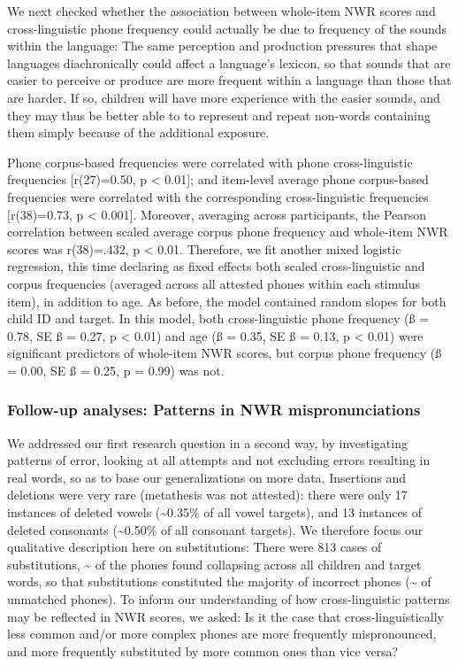 \documentclass[
  english,
  ,man,floatsintext]{apa6}
\begin{document}
We next checked whether the association between whole-item NWR scores and cross-linguistic phone frequency could actually be due to frequency of the sounds within the language: The same perception and production pressures that shape languages diachronically could affect a language's lexicon, so that sounds that are easier to perceive or produce are more frequent within a language than those that are harder. If so, children will have more experience with the easier sounds, and they may thus be better able to to represent and repeat non-words containing them simply because of the additional exposure.

Phone corpus-based frequencies were correlated with phone cross-linguistic frequencies {[}r(27)=0.50, p \textless{} 0.01{]}; and item-level average phone corpus-based frequencies were correlated with the corresponding cross-linguistic frequencies {[}r(38)=0.73, p \textless{} 0.001{]}. Moreover, averaging across participants, the Pearson correlation between scaled average corpus phone frequency and whole-item NWR scores was r(38)=.432, p \textless{} 0.01. Therefore, we fit another mixed logistic regression, this time declaring as fixed effects both scaled cross-linguistic and corpus frequencies (averaged across all attested phones within each stimulus item), in addition to age. As before, the model contained random slopes for both child ID and target. In this model, both cross-linguistic phone frequency (ß = 0.78, SE ß = 0.27, p \textless{} 0.01) and age (ß = 0.35, SE ß = 0.13, p \textless{} 0.01) were significant predictors of whole-item NWR scores, but corpus phone frequency (ß = 0.00, SE ß = 0.25, p = 0.99) was not.

\hypertarget{follow-up-analyses-patterns-in-nwr-mispronunciations}{%
\subsubsection{Follow-up analyses: Patterns in NWR mispronunciations}\label{follow-up-analyses-patterns-in-nwr-mispronunciations}}

We addressed our first research question in a second way, by investigating patterns of error, looking at all attempts and not excluding errors resulting in real words, so as to base our generalizations on more data. Insertions and deletions were very rare (metathesis was not attested): there were only 17 instances of deleted vowels (\textasciitilde0.35\% of all vowel targets), and 13 instances of deleted consonants (\textasciitilde0.50\% of all consonant targets). We therefore focus our qualitative description here on substitutions: There were 813 cases of substitutions, \textasciitilde{} of the phones found collapsing across all children and target words, so that substitutions constituted the majority of incorrect phones (\textasciitilde{} of unmatched phones). To inform our understanding of how cross-linguistic patterns may be reflected in NWR scores, we asked: Is it the case that cross-linguistically less common and/or more complex phones are more frequently mispronounced, and more frequently substituted by more common ones than vice versa?
\end{document}
